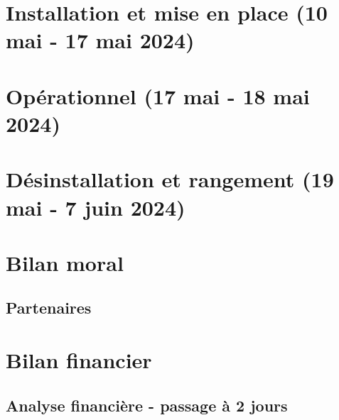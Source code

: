 \documentclass[12pt,a4paper]{report}
\begin{document}
\part{Installation et mise en place (10 mai - 17 mai 2024)}

\part{Opérationnel (17 mai - 18 mai 2024)}

\part{Désinstallation et rangement (19 mai - 7 juin 2024)}

\part{Bilan moral}
\chapter{Partenaires}

\part{Bilan financier}
\chapter{Analyse financière - passage à 2 jours}
\end{document}
